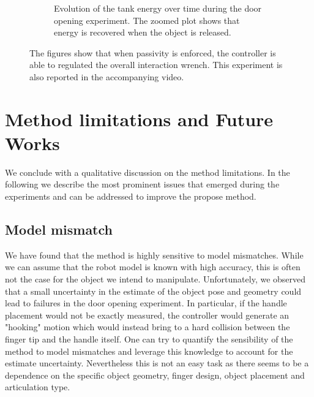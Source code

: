 \begin{figure}[t]
\begin{subfigure}{0.9\columnwidth}
    \caption{Evolution of the tank energy over time during the door opening experiment. The zoomed plot shows that energy is recovered when the object is released.}
\end{subfigure}
    \caption{The figures show that when passivity is enforced, the controller is able to regulated the overall interaction wrench. This experiment is also reported in the accompanying video.}
    \label{fig:passivity_experiment}
\end{figure}



\section{Method limitations and Future Works}\label{sec:limitations_and_future_works}
We conclude  with a qualitative discussion on the method limitations. In the following we describe the most prominent issues that emerged during the experiments and can be addressed to improve the propose method.

\subsection{Model mismatch}
We have found that the method is highly sensitive to model mismatches. While we can assume that the robot model is known with high accuracy, this is often not the case for the object we intend to manipulate. Unfortunately, we observed that a small uncertainty in the estimate of the object pose and geometry could lead to failures in the door opening experiment. In particular, if the handle placement would not be exactly measured, the controller would generate an "hooking" motion which would instead bring to a hard collision between the finger tip and the handle itself. One can try to quantify the sensibility of the method to model mismatches and leverage this knowledge to account for the estimate uncertainty. Nevertheless this is not an easy task as there seems to be a dependence on the specific object geometry, finger design, object placement and articulation type. 

